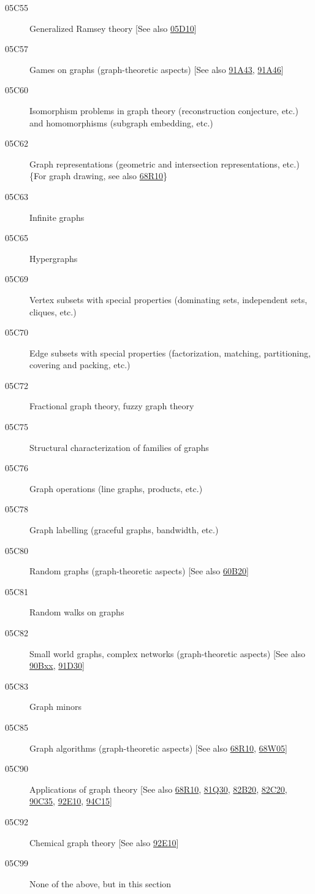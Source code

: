 \begin{description}
\item [05C55]\label{05C55} Generalized Ramsey theory [See also \hyperref[05D10]{05D10}]
\item [05C57]\label{05C57} Games on graphs (graph-theoretic aspects) [See also \hyperref[91A43]{91A43}, \hyperref[91A46]{91A46}]
\item [05C60]\label{05C60} Isomorphism problems in graph theory (reconstruction conjecture, etc.) and homomorphisms (subgraph embedding, etc.)
\item [05C62]\label{05C62} Graph representations (geometric and intersection representations, etc.) \{For graph drawing, see also \hyperref[68R10]{68R10}\}
\item [05C63]\label{05C63} Infinite graphs
\item [05C65]\label{05C65} Hypergraphs
\item [05C69]\label{05C69} Vertex subsets with special properties (dominating sets, independent sets, cliques, etc.)
\item [05C70]\label{05C70} Edge subsets with special properties (factorization, matching, partitioning, covering and packing, etc.)
\item [05C72]\label{05C72} Fractional graph theory, fuzzy graph theory
\item [05C75]\label{05C75} Structural characterization of families of graphs
\item [05C76]\label{05C76} Graph operations (line graphs, products, etc.)
\item [05C78]\label{05C78} Graph labelling (graceful graphs, bandwidth, etc.)
\item [05C80]\label{05C80} Random graphs (graph-theoretic aspects) [See also \hyperref[60B20]{60B20}]
\item [05C81]\label{05C81} Random walks on graphs
\item [05C82]\label{05C82} Small world graphs, complex networks (graph-theoretic aspects) [See also \hyperref[90Bxx]{90Bxx}, \hyperref[91D30]{91D30}]
\item [05C83]\label{05C83} Graph minors
\item [05C85]\label{05C85} Graph algorithms (graph-theoretic aspects) [See also \hyperref[68R10]{68R10}, \hyperref[68W05]{68W05}]
\item [05C90]\label{05C90} Applications of graph theory [See also \hyperref[68R10]{68R10}, \hyperref[81Q30]{81Q30}, \hyperref[82B20]{82B20}, \hyperref[82C20]{82C20}, \hyperref[90C35]{90C35}, \hyperref[92E10]{92E10}, \hyperref[94C15]{94C15}]
\item [05C92]\label{05C92} Chemical graph theory [See also \hyperref[92E10]{92E10}]
\item [05C99]\label{05C99} None of the above, but in this section
\end{description}
